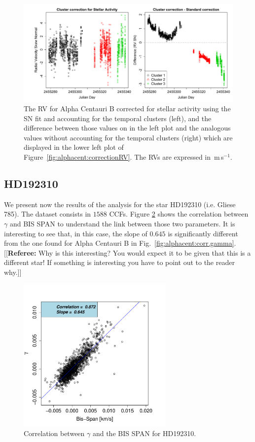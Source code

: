 \documentclass[11pt, oneside]{article}
\def\ms{\hbox{\,m\,s$^{-1}$}}         %
\newcommand{\comment}[1]{{\color{red}[[\textbf{Referee: }#1]]}}
\begin{document}
\begin{figure}[htbp]
   \centering
\includegraphics[width = 6in]{AlphaCenB_clusters_residuals.pdf}  
   \caption{The RV for Alpha Centauri B corrected for stellar activity using the SN fit and accounting for the temporal clusters (left), and the difference between those values on in the left plot and the analogous values without accounting for the temporal clusters (right) which are displayed in the lower left plot of Figure~\ref{fig:alphacent:correctionRV}. The RVs are expressed in \ms.}
   \label{fig:alphacent:clusters_residuals}
\end{figure}

\subsection{HD192310}  \label{sec:Gl785}

We present now the results of the analysis for the star HD192310 (i.e. Gliese 785). The dataset consists in $1588$ CCFs. Figure \ref{fig:Gliese785:corr.gamma} shows the correlation between $\gamma$ and BIS SPAN to understand the link between those two parameters. It is interesting to see that, in this case, the slope of $0.645$ is significantly different from the one found for Alpha Centauri B in Fig.~\ref{fig:alphacent:corr.gamma}.
\comment{Why is this interesting? You would expect it to be given that this is a different star! If something is interesting you have to point out to the reader why.}
%
\begin{figure}[htbp]
   \centering
\includegraphics[height = 3in]{HD19231_[2]gamma_vs_bisspan.pdf} 
   \caption{Correlation between $\gamma$ and the BIS SPAN for HD192310.}
   \label{fig:Gliese785:corr.gamma}
\end{figure}
\end{document}
